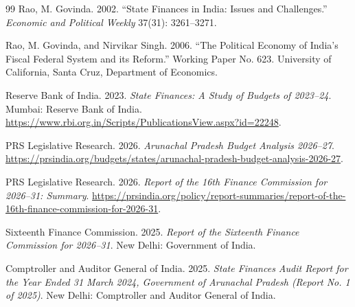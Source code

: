 \documentclass[11pt,a4paper]{article}
\begin{document}
\begin{thebibliography}{99}
Rao, M. Govinda. 2002. ``State Finances in India: Issues and Challenges.'' \emph{Economic and Political Weekly} 37(31): 3261--3271.

Rao, M. Govinda, and Nirvikar Singh. 2006. ``The Political Economy of India's Fiscal Federal System and its Reform.'' Working Paper No. 623. University of California, Santa Cruz, Department of Economics.

Reserve Bank of India. 2023. \emph{State Finances: A Study of Budgets of 2023--24}. Mumbai: Reserve Bank of India. \url{https://www.rbi.org.in/Scripts/PublicationsView.aspx?id=22248}.

PRS Legislative Research. 2026. \emph{Arunachal Pradesh Budget Analysis 2026--27}. \url{https://prsindia.org/budgets/states/arunachal-pradesh-budget-analysis-2026-27}.

PRS Legislative Research. 2026. \emph{Report of the 16th Finance Commission for 2026--31: Summary}. \url{https://prsindia.org/policy/report-summaries/report-of-the-16th-finance-commission-for-2026-31}.

Sixteenth Finance Commission. 2025. \emph{Report of the Sixteenth Finance Commission for 2026--31}. New Delhi: Government of India.

Comptroller and Auditor General of India. 2025. \emph{State Finances Audit Report for the Year Ended 31 March 2024, Government of Arunachal Pradesh (Report No. 1 of 2025)}. New Delhi: Comptroller and Auditor General of India.

\end{thebibliography}
\end{document}
